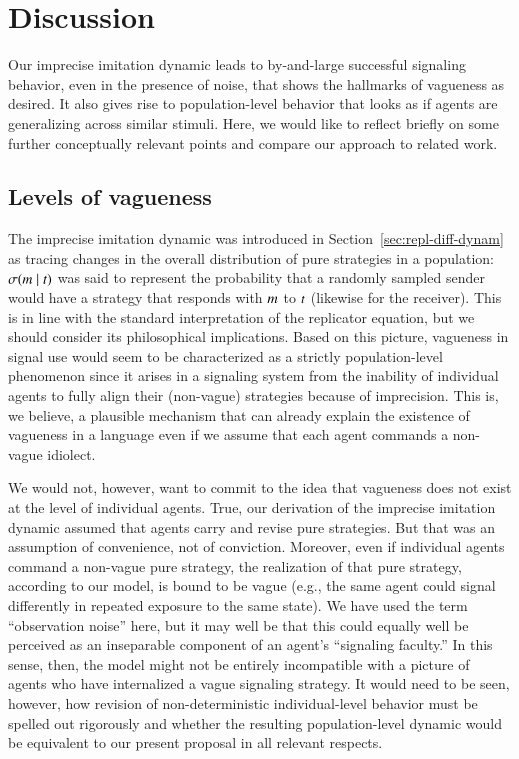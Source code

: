 \documentclass[fleqn,reqno,10pt]{article}
\begin{document}

\section{Discussion}
\label{sec:discussion}

Our imprecise imitation dynamic leads to by-and-large successful signaling behavior, even in
the presence of noise, that shows the hallmarks of vagueness as desired. It also gives rise to
population-level behavior that looks as if agents are generalizing across similar
stimuli. Here, we would like to reflect briefly on some further conceptually relevant points
and compare our approach to related work.

\subsection{Levels of vagueness}
The imprecise imitation dynamic was introduced in Section~\ref{sec:repl-diff-dynam} as tracing
changes in the overall distribution of pure strategies in a population:
$\sigma(m \mid t)$ was said to represent the probability that a randomly sampled
sender would have a strategy that responds with $m$ to $t$ (likewise for the
receiver). This is in line with the standard interpretation of the replicator equation, but we
should consider its philosophical implications. Based on this picture, vagueness in signal use
would seem to be characterized as a strictly population-level phenomenon since it arises in a
signaling system from the inability of individual agents to fully align their (non-vague)
strategies because of imprecision. This is, we believe, a plausible mechanism that can already
explain the existence of vagueness in a language even if we assume that each agent commands a
non-vague idiolect.

We would not, however, want to commit to the idea that vagueness does not exist at the level of
individual agents. True, our derivation of the imprecise imitation dynamic assumed that agents
carry and revise pure strategies. But that was an assumption of convenience, not of
conviction. Moreover, even if individual agents command a non-vague pure strategy, the
realization of that pure strategy, according to our model, is bound to be vague (e.g., the same
agent could signal differently in repeated exposure to the same state). We have used the term
``observation noise'' here, but it may well be that this could equally well be perceived as an
inseparable component of an agent's ``signaling faculty.'' In this sense, then, the model might
not be entirely incompatible with a picture of agents who have internalized a vague signaling
strategy. It would need to be seen, however, how revision of non-deterministic individual-level
behavior must be spelled out rigorously and whether the resulting population-level dynamic
would be equivalent to our present proposal in all relevant respects.
\end{document}
